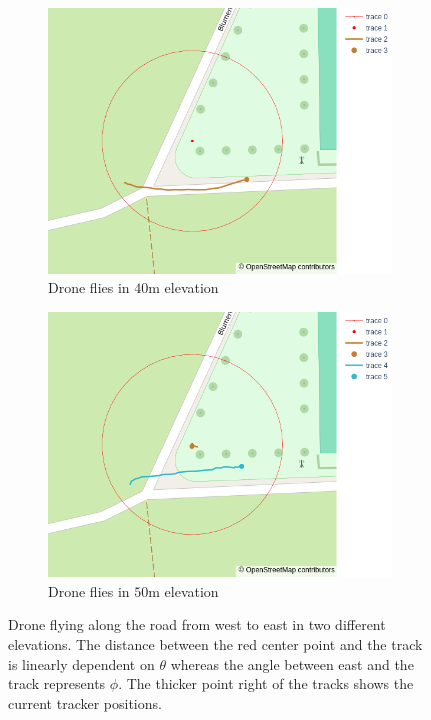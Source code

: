 \begin{figure}[h]
	\centering
	\begin{subfigure}[t]{0.45\textwidth}
		\centering
		\includegraphics[width=\textwidth]{images/7_measurements/we_low.png}
		\caption{Drone flies in $40$m elevation}
		\label{meas:fig:west east low}
	\end{subfigure}
	\hfill
	\begin{subfigure}[t]{0.45\textwidth}
		\centering
		\includegraphics[width=\textwidth]{images/7_measurements/we_high.png}
		\caption{Drone flies in $50$m elevation}
		\label{meas:fig:west east high}
	\end{subfigure}
	\caption{Drone flying along the road from west to east in two different
    elevations.
    The distance between the red center point and the track is linearly 
    dependent on $\theta$ whereas the angle between east and the track represents $\phi$.
    The thicker point right of the tracks shows the current tracker positions.}
	\label{meas:fig:west east}
\end{figure}
